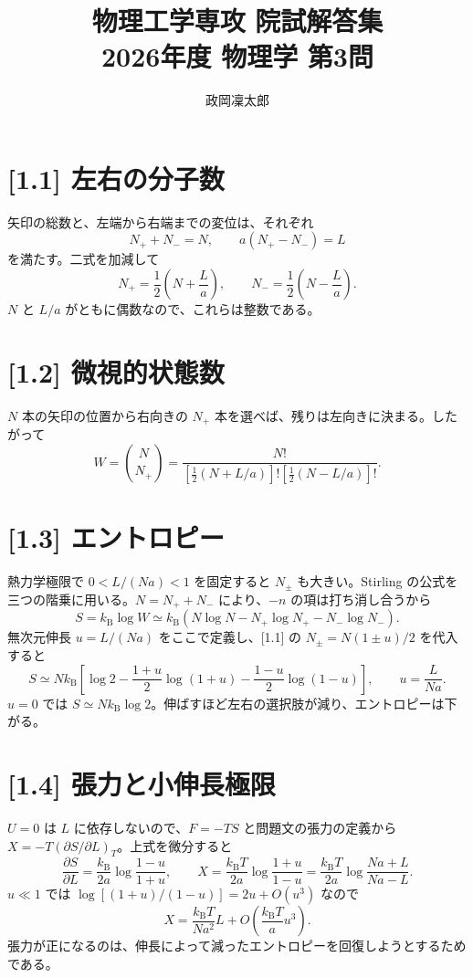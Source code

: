 \documentclass[11pt,a4paper]{article}
\title{物理工学専攻 院試解答集\\2026年度 物理学 第3問}
\author{政岡凜太郎}
\date{}
\begin{document}
\maketitle

\section*{[1.1] 左右の分子数}
矢印の総数と、左端から右端までの変位は、それぞれ
\[
N_++N_-=N,\qquad a(N_+-N_-)=L
\]
を満たす。二式を加減して
\[
\boxed{N_+=\frac12\left(N+\frac La\right)},\qquad
\boxed{N_-=\frac12\left(N-\frac La\right)}.
\]
$N$ と $L/a$ がともに偶数なので、これらは整数である。

\section*{[1.2] 微視的状態数}
$N$ 本の矢印の位置から右向きの $N_+$ 本を選べば、残りは左向きに決まる。したがって
\[
\boxed{W=\binom{N}{N_+}
=\frac{N!}{\left[\frac12(N+L/a)\right]!
\left[\frac12(N-L/a)\right]!}}.
\]

\section*{[1.3] エントロピー}
熱力学極限で $0<L/(Na)<1$ を固定すると $N_\pm$ も大きい。Stirling の公式を三つの階乗に用いる。$N=N_++N_-$ により、$-n$ の項は打ち消し合うから
\[
S=k_{\mathrm B}\log W\simeq k_{\mathrm B}
\left(N\log N-N_+\log N_+-N_-\log N_-\right).
\]
無次元伸長 $u=L/(Na)$ をここで定義し、[1.1] の $N_\pm=N(1\pm u)/2$ を代入すると
\[
\boxed{S\simeq Nk_{\mathrm B}\left[
\log2-\frac{1+u}{2}\log(1+u)
-\frac{1-u}{2}\log(1-u)\right],\qquad u=\frac{L}{Na}.}
\]
$u=0$ では $S\simeq Nk_{\mathrm B}\log2$。伸ばすほど左右の選択肢が減り、エントロピーは下がる。

\section*{[1.4] 張力と小伸長極限}
$U=0$ は $L$ に依存しないので、$F=-TS$ と問題文の張力の定義から $X=-T(\partial S/\partial L)_T$。上式を微分すると
\[
\frac{\partial S}{\partial L}
=\frac{k_{\mathrm B}}{2a}\log\frac{1-u}{1+u},
\qquad
\boxed{X=\frac{k_{\mathrm B}T}{2a}
\log\frac{1+u}{1-u}
=\frac{k_{\mathrm B}T}{2a}
\log\frac{Na+L}{Na-L}.}
\]
$u\ll1$ では $\log[(1+u)/(1-u)]=2u+O(u^3)$ なので
\[
\boxed{X=\frac{k_{\mathrm B}T}{Na^2}L
+O\!\left(\frac{k_{\mathrm B}T}{a}u^3\right).}
\]
張力が正になるのは、伸長によって減ったエントロピーを回復しようとするためである。
\end{document}
